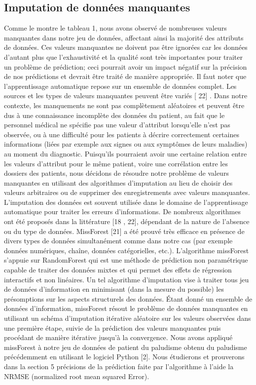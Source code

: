 \subsection{ Imputation de données manquantes}
Comme le montre le tableau 1, nous avons observé de nombreuses valeurs manquantes dans notre jeu de données, affectant ainsi la majorité des attributs de données. Ces valeurs manquantes ne doivent pas être ignorées car les données d’autant plus que l'exhaustivité et la qualité sont très importantes pour traiter un problème de prédiction; ceci pourrait avoir un impact négatif sur la précision de nos prédictions et devrait être traité de manière appropriée. Il faut noter que l'apprentissage automatique repose sur un ensemble de données complet. Les sources et les types de valeurs manquantes peuvent être variés [ 22] . Dans notre contexte, les manquements ne sont pas complètement aléatoires et peuvent être dus à une connaissance incomplète des données du patient, au fait que le personnel médical ne spécifie pas une valeur d’attribut lorsqu’elle n’est pas observée, ou à une difficulté pour les patients à décrire correctement certaines informations (liées par exemple aux signes ou aux symptômes de leurs maladies) au moment du diagnostic. Puisqu'ils pourraient avoir une certaine relation entre les valeurs d'attribut pour le même patient, voire une corrélation entre les dossiers des patients, nous décidons de résoudre notre problème de valeurs manquantes en utilisant des algorithmes d'imputation au lieu de choisir des valeurs arbitraires ou de supprimer des enregistrements avec valeurs manquantes.
L’imputation des données est souvent utilisée dans le domaine de l’apprentissage automatique pour traiter les erreurs d’informations. De nombreux algorithmes ont été proposés dans la littérature [18 , 22], dépendant de la nature de l’absence ou du type de données. MissForest [21] a été prouvé très efficace en présence de divers types de données simultanément comme dans notre cas (par exemple données numériques, chaîne, données catégorielles, etc.). L'algorithme missForest s'appuie sur 
RandomForest qui est une méthode de prédiction non paramétrique capable de traiter des données mixtes et qui permet des effets de régression interactifs et non linéaires. Un tel algorithme d’imputation vise à traiter tous jeu de données d’information en minimisant (dans la mesure du possible) les présomptions sur les aspects structurels des données. Étant donné un ensemble de données d’information, missForest résout le problème de données manquantes en utilisant un schéma d'imputation itérative aléatoire sur les valeurs observées dans une première étape, suivie de la prédiction des valeurs manquantes puis procédant de manière itérative jusqu'à la convergence.
Nous avons appliqué missForest à notre jeu de données de patient du paludisme obtenu du paludisme précédemment  en utilisant le logiciel Python [2]. 
Nous étudierons et prouverons dans la section 5 précisions de la prédiction faite par l’algorithme à l’aide la NRMSE (normalized root mean squared Error).


